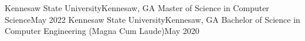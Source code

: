 \educationSubheading
{Kennesaw State University}{Kennesaw, GA}
{Master of Science in Computer Science}{May 2022}
\educationSubheading
{Kennesaw State University}{Kennesaw, GA}
{Bachelor of Science in Computer Engineering (Magna Cum Laude)}{May 2020}
